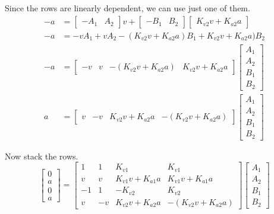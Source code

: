Since the rows are linearly dependent, we can use just one of them.
\begin{align*}
  -a &=
    \begin{bmatrix}
      -A_1 & A_2
    \end{bmatrix} v +
    \begin{bmatrix}
      -B_1 & B_2
    \end{bmatrix}
    \begin{bmatrix}
      K_{v2} v + K_{a2} a
    \end{bmatrix} \\
  -a &= -v A_1 + v A_2 - (K_{v2} v + K_{a2} a) B_1 + K_{v2} v + K_{a2} a) B_2 \\
  -a &=
    \begin{bmatrix}
      -v & v & -(K_{v2} v + K_{a2} a) & K_{v2} v+ K_{a2} a
    \end{bmatrix}
    \begin{bmatrix}
      A_1 \\
      A_2 \\
      B_1 \\
      B_2
    \end{bmatrix} \\
  a &=
    \begin{bmatrix}
      v & -v & K_{v2} v + K_{a2} a & -(K_{v2} v + K_{a2} a)
    \end{bmatrix}
    \begin{bmatrix}
      A_1 \\
      A_2 \\
      B_1 \\
      B_2
    \end{bmatrix}
\end{align*}

Now stack the rows.
\begin{equation*}
  \begin{bmatrix}
    0 \\
    a \\
    0 \\
    a
  \end{bmatrix} =
  \begin{bmatrix}
    1 & 1 & K_{v1} & K_{v1} \\
    v & v & K_{v1} v + K_{a1} a & K_{v1} v + K_{a1} a \\
    -1 & 1 & -K_{v2} & K_{v2} \\
    v & -v & K_{v2} v + K_{a2} a & -(K_{v2} v + K_{a2} a)
  \end{bmatrix}
  \begin{bmatrix}
    A_1 \\
    A_2 \\
    B_1 \\
    B_2
  \end{bmatrix}
\end{equation*}

